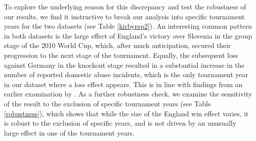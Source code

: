 \documentclass[12pt, a4paper]{article}
\begin{document}
To explore the underlying reason for this discrepancy and test the robustness of our results, we find it instructive to break our analysis into specific tournament years for the two datasets (see Table \ref{kirbyrep2}). An interesting common pattern in both datasets is the large effect of England's victory over Slovenia in the group stage of the 2010 World Cup, which, after much anticipation, secured their progression to the next stage of the tournament. Equally, the subsequent loss against Germany in the knockout stage resulted in a substantial increase in the number of reported domestic abuse incidents, which is the only tournament year in our dataset where a loss effect appears. This is in line with findings from an earlier examination by \citet{Brimicombe2012}. As a further robustness check, we examine the sensitivity of the result to the exclusion of specific tournament years  (see Table \ref{robustness}), which shows that while the size of the England win effect varies, it is robust to the exclusion of specific years, and is not driven by an unusually large effect in one of the tournament years.

\end{document}
